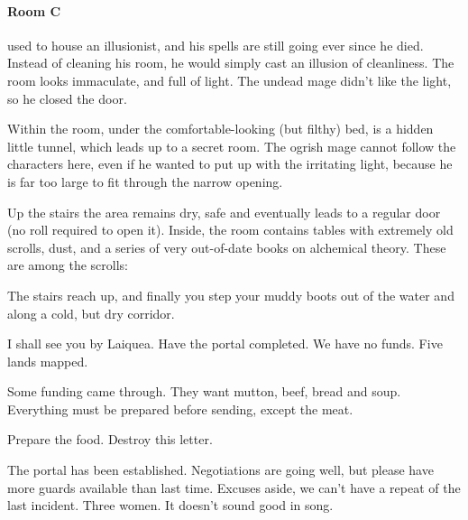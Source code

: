 \begin{multicols}{2}
\paragraph{Room C} used to house an illusionist, and his spells are still going ever since he died.  Instead of cleaning his room, he would simply cast an illusion of cleanliness.  The room looks immaculate, and full of light.  The undead mage didn't like the light, so he closed the door.

Within the room, under the comfortable-looking (but filthy) bed, is a hidden little tunnel, which leads up to a secret room.
The ogrish mage cannot follow the characters here, even if he wanted to put up with the irritating light, because he is far too large to fit through the narrow opening.


Up the stairs the area remains dry, safe and eventually leads to a regular door (no roll required to open it).  Inside, the room contains tables with extremely old scrolls, dust, and a series of very out-of-date books on alchemical theory.  These are among the scrolls:

\begin{boxtext}

	The stairs reach up, and finally you step your muddy boots out of the water and along a cold, but dry corridor.

\end{boxtext}

\begin{exampletext}

	I shall see you by Laiquea.  Have the portal completed.  We have no funds.  Five lands mapped.

\end{exampletext}

\begin{exampletext}

	Some funding came through.  They want mutton, beef, bread and soup.  Everything must be prepared before sending, except the meat.

	Prepare the food.  Destroy this letter.

\end{exampletext}

\begin{exampletext}

	The portal has been established.  Negotiations are going well, but please have more guards available than last time.  Excuses aside, we can't have a repeat of the last incident.  Three women.  It doesn't sound good in song.


\end{exampletext}
\end{multicols}
